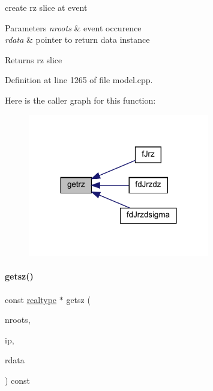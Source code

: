 create rz slice at event 
\begin{DoxyParams}{Parameters}
{\em nroots} & event occurence \\
\hline
{\em rdata} & pointer to return data instance \\
\hline
\end{DoxyParams}
\begin{DoxyReturn}{Returns}
rz slice 
\end{DoxyReturn}


Definition at line 1265 of file model.\+cpp.

Here is the caller graph for this function\+:
\nopagebreak
\begin{figure}[H]
\begin{center}
\leavevmode
\includegraphics[width=224pt]{classamici_1_1_model_ab2a9be3bb641741a52ddc48fcd9aa143_icgraph}
\end{center}
\end{figure}
\mbox{\label{classamici_1_1_model_a78863f621eda7016ab7136a357dacdaf}} 
\paragraph{\texorpdfstring{getsz()}{getsz()}}
{\footnotesize\ttfamily const \mbox{\hyperlink{namespaceamici_a1bdce28051d6a53868f7ccbf5f2c14a3}{realtype}} $\ast$ getsz (\begin{DoxyParamCaption}\item[{const int}]{nroots,  }\item[{const int}]{ip,  }\item[{const \mbox{\hyperlink{classamici_1_1_return_data}{Return\+Data}} $\ast$}]{rdata }\end{DoxyParamCaption}) const\hspace{0.3cm}{\ttfamily [protected]}}

